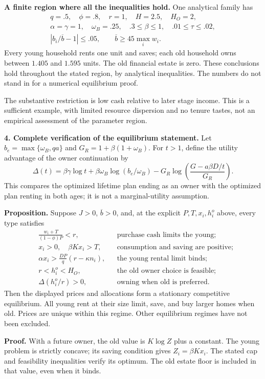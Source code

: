 \documentclass[11pt]{article}
\newcommand{\avg}[1]{\overline{#1}}
\begin{document}
\textbf{A finite region where all the inequalities hold.}
One analytical family has
\[
\begin{gathered}
q=.5,\quad \phi=.8,\quad r=1,\quad H=2.5,\quad H_O=2,\\
\alpha=\gamma=1,\quad\omega_B=.25,\quad
.3\le\beta\le1,\quad .01\le\tau\le.02,\\
\left|b_i/\avg b-1\right|\le .05,
\qquad \avg b\ge45\max_i w_i.
\end{gathered}
\]
Every young household rents one unit and saves; each old household owns
between $1.405$ and $1.595$ units. The old financial estate is zero.
These conclusions hold throughout the stated region, by analytical
inequalities. The numbers do not stand in for a numerical equilibrium proof.

The substantive restriction is low cash relative to later stage income.
This is a sufficient example, with limited resource dispersion and no tenure
tastes, not an empirical assessment of the parameter region.

\newpage
\textbf{4. Complete verification of the equilibrium statement.}
Let $b_e=\max\{\omega_B,qa\}$ and $G_R=1+\beta(1+\omega_B)$.
For $t>1$, define the utility advantage of the owner continuation by
\[
\Delta(t)=\beta\gamma\log t
 +\beta\omega_B\log(b_e/\omega_B)
 -G_R\log\left(\frac{G-a\beta D/t}{G_R}\right).
\]
This compares the optimized lifetime plan ending as an owner with the
optimized plan renting in both ages; it is not a marginal-utility assumption.

\textbf{Proposition.}
Suppose $J>0$, $\avg b>0$, and, at the explicit $P,T,x_i,h_i^o$ above,
every type satisfies
\[
\boxed{\begin{aligned}
&\frac{w_i+T}{(1-\phi)P}<r,
&&\text{purchase cash limits the young;}\\
&x_i>0,\quad \beta Kx_i>T,
&&\text{consumption and saving are positive;}\\
&\alpha x_i>\frac{DP}{q}(r-\kappa n_i),
&&\text{the young rental limit binds;}\\
&r<h_i^o<H_O,
&&\text{the old owner choice is feasible;}\\
&\Delta(h_i^o/r)>0,
&&\text{owning when old is preferred.}
\end{aligned}}
\]
Then the displayed prices and allocations form a stationary competitive
equilibrium. All young rent at their size limit, save, and buy larger homes
when old. Prices are unique within this regime. Other equilibrium regimes
have not been excluded.

\textbf{Proof.}
With a future owner, the old value is $K\log Z$ plus a constant. The young
problem is strictly concave; its saving condition gives $Z_i=\beta Kx_i$.
The stated cap and feasibility inequalities verify its optimum. The old
estate floor is included in that value, even when it binds.
\end{document}
